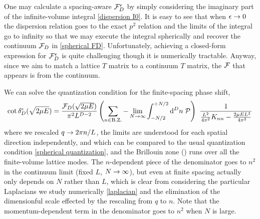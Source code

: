 One may calculate a spacing-aware $\mathcal{F}_D^\epsilon$ by simply considering the imaginary part of the infinite-volume integral \eqref{dispersion I0}.
It is easy to see that when $\epsilon\rightarrow0$ the dispersion relation goes to the exact $p^2$ relation and the limits of the integral go to infinity so that we may execute the integral spherically and recover the continuum $\mathcal{F}_D$ in \eqref{spherical FD}.
Unfortunately, achieving a closed-form expression for $\mathcal{F}_D^\epsilon$ is quite challenging though it is numerically tractable.
Anyway, since we aim to match a lattice $T$ matrix to a continuum $T$ matrix, the $\mathcal{F}$ that appears is from the continuum.

We can solve the quantization condition for the finite-spacing phase shift,
\begin{align}
    \cot \delta_D^\epsilon(\sqrt{2 \mu E})
    =
    \frac{\mathcal{F}_D(\sqrt{2 \mu E})}{\pi^2 L^{D-2}}
    \left(\sum_{n\in\text{B.Z.}} - \lim_{N\rightarrow\infty}\int_{-N/2}^{+N/2} \mathrm{d}^D n\; \mathcal{P} \right)\  \frac{1}{\frac{L^2}{4\pi^2} K_{nn}-\frac{2\mu E L^2}{4\pi^2}}
\end{align}
where we rescaled $q\rightarrow 2\pi n/L$, the limits are understood for each spatial direction independently, and which can be compared to the usual quantization condition \eqref{spherical quantization}, and the Brillouin zone (\BZ) runs over all the finite-volume lattice modes.
The $n$-dependent piece of the denominator goes to $n^2$ in the continuum limit (fixed $L$, $N\rightarrow\infty$), but even at finite spacing actually only depends on $N$ rather than $L$, which is clear from considering the particular Laplacians we study numerically \eqref{laplacian} and the elimination of the dimensionful scale effected by the rescaling from $q$ to $n$.
Note that the momentum-dependent term in the denominator goes to $n^2$ when $N$ is large.

